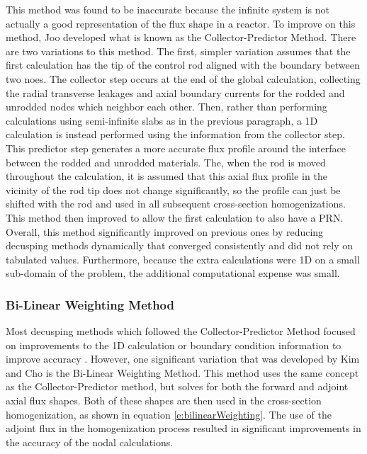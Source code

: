 This method was found to be inaccurate because the infinite system is not actually a good representation of the flux shape in a reactor.  To improve on this method, Joo developed what is known as the Collector-Predictor Method.  There are two variations to this method.  The first, simpler variation assumes that the first calculation has the tip of the control rod aligned with the boundary between two noes.  The collector step occurs at the end of the global calculation, collecting the radial transverse leakages and axial boundary currents for the rodded and unrodded nodes which neighbor each other.  Then, rather than performing calculations using semi-infinite slabs as in the previous paragraph, a 1D calculation is instead performed using the information from the collector step.  This predictor step generates a more accurate flux profile around the interface between the rodded and unrodded materials.  The, when the rod is moved throughout the calculation, it is assumed that this axial flux profile in the vicinity of the rod tip does not change significantly, so the profile can just be shifted with the rod and used in all subsequent cross-section homogenizations.  This method then improved to allow the first calculation to also have a PRN.  Overall, this method significantly improved on previous ones by reducing decusping methods dynamically that converged consistently and did not rely on tabulated values.  Furthermore, because the extra calculations were 1D on a small sub-domain of the problem, the additional computational expense was small.

\subsubsection{Bi-Linear Weighting Method}

Most decusping methods which followed the Collector-Predictor Method focused on improvements to the 1D calculation or boundary condition information to improve accuracy \cite{gehinThesis1992quasi,smith1992enhancementsStudxvickCoreManagementSystem,lee1998CuspingCorrection1DFineMeshFluxProfiles}.  However, one significant variation that was developed by Kim and Cho \cite{kim1990BilinearWeighting} is the Bi-Linear Weighting Method.  This method uses the same concept as the Collector-Predictor method, but solves for both the forward and adjoint axial flux shapes.  Both of these shapes are then used in the cross-section homogenization, as shown in equation \ref{e:bilinearWeighting}.  The use of the adjoint flux in the homogenization process resulted in significant improvements in the accuracy of the nodal calculations.

